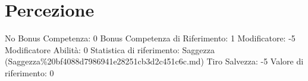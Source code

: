 \section{Percezione}\label{percezione}

\begin{description}
\tightlist
\item[Tags: ABI]
No Bonus Competenza: 0 Bonus Competenza di Riferimento: 1 Modificatore:
-5 Modificatore Abilità: 0 Statistica di riferimento: Saggezza
(Saggezza\%20bf4088d7986941e28251cb3d2c451c6c.md) Tiro Salvezza: -5
Valore di riferimento: 0
\end{description}
